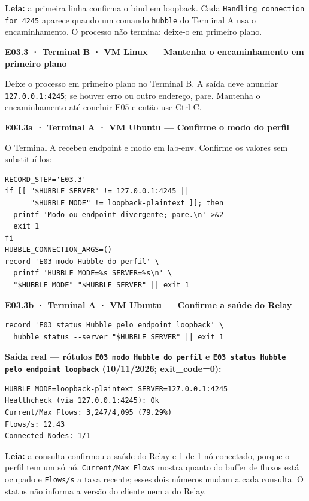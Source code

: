 \documentclass[12pt,openany,oneside,a4paper,chapter=TITLE,english,brazil]{abntex2}
\begin{document}
\textbf{Leia:} a primeira linha confirma o bind em loopback. Cada \texttt{Handling connection for 4245} aparece quando um comando \texttt{hubble} do Terminal A usa o encaminhamento. O processo não termina: deixe-o em primeiro plano.

\textbf{E03.3 · Terminal B · VM Linux --- Mantenha o encaminhamento em primeiro plano}

Deixe o processo em primeiro plano no Terminal B. A saída deve anunciar \texttt{127.\allowbreak{}0.\allowbreak{}0.\allowbreak{}1:\allowbreak{}4245}; se houver erro ou outro endereço, pare. Mantenha o encaminhamento até concluir E05 e então use Ctrl-C.

\clearpage

\textbf{E03.3a · Terminal A · VM Ubuntu --- Confirme o modo do perfil}

O Terminal A recebeu endpoint e modo em lab-env. Confirme os valores sem substituí-los:

\begin{verbatim}
RECORD_STEP='E03.3'
if [[ "$HUBBLE_SERVER" != 127.0.0.1:4245 ||
      "$HUBBLE_MODE" != loopback-plaintext ]]; then
  printf 'Modo ou endpoint divergente; pare.\n' >&2
  exit 1
fi
HUBBLE_CONNECTION_ARGS=()
record 'E03 modo Hubble do perfil' \
  printf 'HUBBLE_MODE=%s SERVER=%s\n' \
  "$HUBBLE_MODE" "$HUBBLE_SERVER" || exit 1
\end{verbatim}

\textbf{E03.3b · Terminal A · VM Ubuntu --- Confirme a saúde do Relay}

\begin{verbatim}
record 'E03 status Hubble pelo endpoint loopback' \
  hubble status --server "$HUBBLE_SERVER" || exit 1
\end{verbatim}

\clearpage

\textbf{Saída real --- rótulos \texttt{E03 modo Hubble do perfil} e \texttt{E03 status Hubble pelo endpoint loopback} (10/11/2026; exit\_code=0):}

\begin{verbatim}
HUBBLE_MODE=loopback-plaintext SERVER=127.0.0.1:4245
Healthcheck (via 127.0.0.1:4245): Ok
Current/Max Flows: 3,247/4,095 (79.29%)
Flows/s: 12.43
Connected Nodes: 1/1
\end{verbatim}

\textbf{Leia:} a consulta confirmou a saúde do Relay e 1 de 1 nó conectado, porque o perfil tem um só nó. \texttt{Current/\allowbreak{}Max Flows} mostra quanto do buffer de fluxos está ocupado e \texttt{Flows/\allowbreak{}s} a taxa recente; esses dois números mudam a cada consulta. O status não informa a versão do cliente nem a do Relay.
\end{document}
